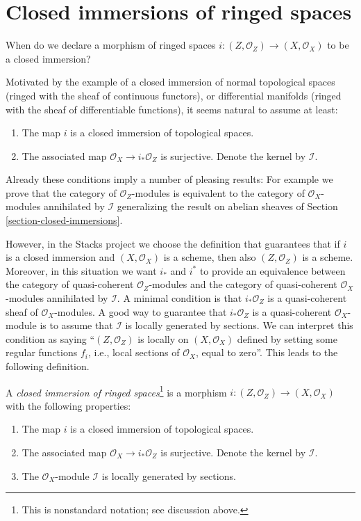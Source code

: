 \section{Closed immersions of ringed spaces}
\label{section-closed-immersion}

\noindent
When do we declare a morphism of ringed spaces
$i : (Z, \mathcal{O}_Z) \to (X, \mathcal{O}_X)$
to be a closed immersion?

\medskip\noindent
Motivated by the example of a closed immersion of normal topological spaces
(ringed with the sheaf of continuous functors), or differential manifolds
(ringed with the sheaf of differentiable functions), it seems natural to
assume at least:
\begin{enumerate}
\item The map $i$ is a closed immersion of topological spaces.
\item The associated map $\mathcal{O}_X \to i_*\mathcal{O}_Z$
is surjective. Denote the kernel by $\mathcal{I}$.
\end{enumerate}
Already these conditions imply a number of pleasing results: For example
we prove that the category of $\mathcal{O}_Z$-modules is equivalent to
the category of $\mathcal{O}_X$-modules annihilated by $\mathcal{I}$
generalizing the result on abelian sheaves of
Section \ref{section-closed-immersions}.

\medskip\noindent
However, in the Stacks project we choose the
definition that guarantees that if $i$ is a closed immersion
and $(X, \mathcal{O}_X)$ is a scheme, then also $(Z, \mathcal{O}_Z)$
is a scheme. Moreover, in this situation we want $i_*$ and $i^*$
to provide an equivalence between the category of quasi-coherent
$\mathcal{O}_Z$-modules and the category of quasi-coherent
$\mathcal{O}_X$-modules annihilated by $\mathcal{I}$.
A minimal condition is that $i_*\mathcal{O}_Z$ is a
quasi-coherent sheaf of $\mathcal{O}_X$-modules.
A good way to guarantee that $i_*\mathcal{O}_Z$ is a
quasi-coherent $\mathcal{O}_X$-module is to assume that
$\mathcal{I}$ is locally generated by sections.
We can interpret this condition as saying ``$(Z, \mathcal{O}_Z)$ is
locally on $(X, \mathcal{O}_X)$ defined by setting some regular functions
$f_i$, i.e., local sections of $\mathcal{O}_X$, equal to zero''.
This leads to the following definition.

\begin{definition}
\label{definition-closed-immersion}
A {\it closed immersion of ringed spaces}\footnote{This is
nonstandard notation; see discussion above.} is a morphism
$i : (Z, \mathcal{O}_Z) \to (X, \mathcal{O}_X)$
with the following properties:
\begin{enumerate}
\item The map $i$ is a closed immersion of topological spaces.
\item The associated map $\mathcal{O}_X \to i_*\mathcal{O}_Z$
is surjective. Denote the kernel by $\mathcal{I}$.
\item The $\mathcal{O}_X$-module $\mathcal{I}$ is locally
generated by sections.
\end{enumerate}
\end{definition}

